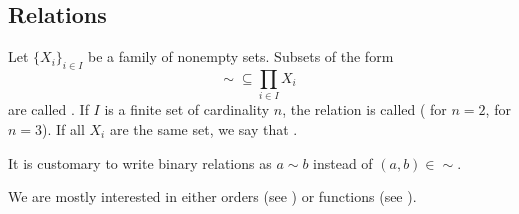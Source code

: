 \subsection{Relations}\label{subsec:relations}

\begin{definition}\label{def:relation}
  Let \( \{ X_i \}_{i \in I} \) be a family of nonempty sets.
  Subsets of the form
  \begin{equation*}
    \sim\; \subseteq \prod_{i \in I} X_i
  \end{equation*}
  are called . If \( I \) is a finite set of cardinality \( n \), the relation is called  ( for \( n = 2 \),  for \( n = 3 \)). If all \( X_i \) are the same set, we say that .

  It is customary to write binary relations as \( a \sim b \) instead of \( (a, b) \in \sim \).
\end{definition}

\begin{remark}\label{remark:main_relation_types}
  We are mostly interested in either orders (see ) or functions (see ).
\end{remark}

